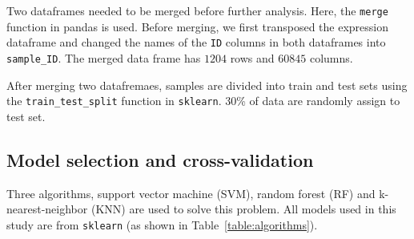 \documentclass{article}
\begin{document}
Two dataframes needed to be merged before further analysis. Here, the \texttt{merge} function in pandas is used. Before merging, we first transposed the expression dataframe and changed the names of the \texttt{ID} columns in both dataframes into \texttt{sample\_ID}. The merged data frame has $1204$ rows and $60845$ columns.

After merging two datafremaes, samples are divided into train and test sets using the \texttt{train\_test\_split} function in \texttt{sklearn}. 30\% of data are randomly assign to test set.

\subsection{Model selection and cross-validation}
Three algorithms, support vector machine (SVM), random forest (RF) and k-nearest-neighbor (KNN) are used to solve this problem. All models used in this study are from \texttt{sklearn} (as shown in Table~\ref{table:algorithms}). 
\end{document}
